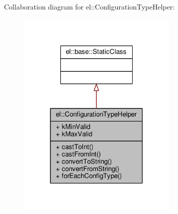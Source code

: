 Collaboration diagram for el\+:\+:Configuration\+Type\+Helper\+:
\nopagebreak
\begin{figure}[H]
\begin{center}
\leavevmode
\includegraphics[width=218pt]{d7/dbf/classel_1_1ConfigurationTypeHelper__coll__graph}
\end{center}
\end{figure}
